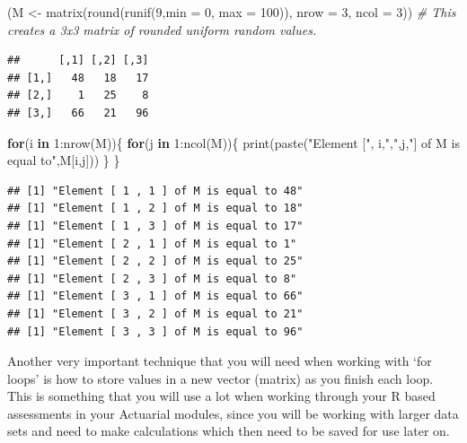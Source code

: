 \documentclass[
]{book}
\newenvironment{Shaded}{\begin{snugshade}}{\end{snugshade}}
\newcommand{\AttributeTok}[1]{\textcolor[rgb]{0.77,0.63,0.00}{#1}}
\newcommand{\CommentTok}[1]{\textcolor[rgb]{0.56,0.35,0.01}{\textit{#1}}}
\newcommand{\ControlFlowTok}[1]{\textcolor[rgb]{0.13,0.29,0.53}{\textbf{#1}}}
\newcommand{\DecValTok}[1]{\textcolor[rgb]{0.00,0.00,0.81}{#1}}
\newcommand{\FunctionTok}[1]{\textcolor[rgb]{0.00,0.00,0.00}{#1}}
\newcommand{\NormalTok}[1]{#1}
\newcommand{\OtherTok}[1]{\textcolor[rgb]{0.56,0.35,0.01}{#1}}
\newcommand{\SpecialCharTok}[1]{\textcolor[rgb]{0.00,0.00,0.00}{#1}}
\newcommand{\StringTok}[1]{\textcolor[rgb]{0.31,0.60,0.02}{#1}}
\theoremstyle{definition}
\theoremstyle{definition}
\theoremstyle{definition}
\theoremstyle{definition}
\theoremstyle{remark}
\begin{document}
\begin{Shaded}
\begin{Highlighting}[]
\NormalTok{(M }\OtherTok{\textless{}{-}} \FunctionTok{matrix}\NormalTok{(}\FunctionTok{round}\NormalTok{(}\FunctionTok{runif}\NormalTok{(}\DecValTok{9}\NormalTok{,}\AttributeTok{min =} \DecValTok{0}\NormalTok{, }\AttributeTok{max =} \DecValTok{100}\NormalTok{)), }\AttributeTok{nrow =} \DecValTok{3}\NormalTok{, }\AttributeTok{ncol =} \DecValTok{3}\NormalTok{)) }\CommentTok{\# This creates a 3x3 matrix of rounded uniform random values. }
\end{Highlighting}
\end{Shaded}

\begin{verbatim}
##      [,1] [,2] [,3]
## [1,]   48   18   17
## [2,]    1   25    8
## [3,]   66   21   96
\end{verbatim}

\begin{Shaded}
\begin{Highlighting}[]
\ControlFlowTok{for}\NormalTok{(i }\ControlFlowTok{in} \DecValTok{1}\SpecialCharTok{:}\FunctionTok{nrow}\NormalTok{(M))\{}
  \ControlFlowTok{for}\NormalTok{(j }\ControlFlowTok{in} \DecValTok{1}\SpecialCharTok{:}\FunctionTok{ncol}\NormalTok{(M))\{}
    \FunctionTok{print}\NormalTok{(}\FunctionTok{paste}\NormalTok{(}\StringTok{"Element ["}\NormalTok{, i,}\StringTok{","}\NormalTok{,j,}\StringTok{"] of M is equal to"}\NormalTok{,M[i,j]))}
\NormalTok{    \}}
\NormalTok{\}}
\end{Highlighting}
\end{Shaded}

\begin{verbatim}
## [1] "Element [ 1 , 1 ] of M is equal to 48"
## [1] "Element [ 1 , 2 ] of M is equal to 18"
## [1] "Element [ 1 , 3 ] of M is equal to 17"
## [1] "Element [ 2 , 1 ] of M is equal to 1"
## [1] "Element [ 2 , 2 ] of M is equal to 25"
## [1] "Element [ 2 , 3 ] of M is equal to 8"
## [1] "Element [ 3 , 1 ] of M is equal to 66"
## [1] "Element [ 3 , 2 ] of M is equal to 21"
## [1] "Element [ 3 , 3 ] of M is equal to 96"
\end{verbatim}

Another very important technique that you will need when working with `for loops' is how to store values in a new vector (matrix) as you finish each loop. This is something that you will use a lot when working through your R based assessments in your Actuarial modules, since you will be working with larger data sets and need to make calculations which then need to be saved for use later on.
\end{document}
